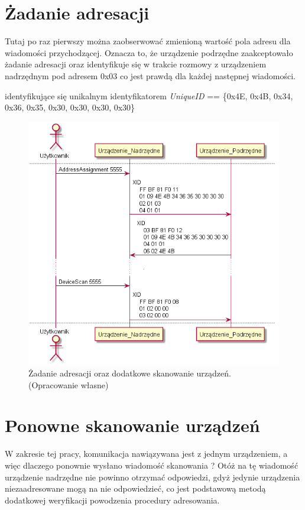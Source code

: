     \section{Żadanie adresacji}
    Tutaj po raz pierwszy można zaobserwować zmienioną wartość pola adresu dla wiadomości
    przychodzącej. Oznacza to, że urządzenie podrzędne zaakceptowało żadanie adresacji 
    oraz identyfikuje się w trakcie rozmowy z urządzeniem nadrzędnym pod adresem 0x03 co
    jest prawdą dla każdej następnej wiadomości.
 
    identyfikujące się unikalnym identyfikatorem \textit{UniqueID} == \{0x4E, 0x4B, 0x34, 0x36, 0x35, 0x30, 0x30, 0x30, 0x30\}

    \begin{figure}[h!]
        \centering
        \includegraphics[scale=0.75]{out/Diagramy/UML_DiagramOfSequence_New/UML_DiagramOfSequence_New-page2.png}
        \caption{Żadanie adresacji oraz dodatkowe skanowanie urządzeń.
            \newline(Opracowanie własne)}
        \label{fig:DiagramSequence_AddressAssignment_SecondDeviceScan}
    \end{figure}

    \section{Ponowne skanowanie urządzeń}
    W zakresie tej pracy, komunikacja nawiązywana jest z jednym urządzeniem, a więc dlaczego
    ponownie wysłano wiadomość skanowania ? Otóż na tę wiadomość urządzenie nadrzędne
    nie powinno otrzymać odpowiedzi, gdyż jedynie urządzenia niezaadresowane mogą na nie 
    odpowiedzieć, co jest podstawową metodą dodatkowej weryfikacji powodzenia procedury
    adresowania.

